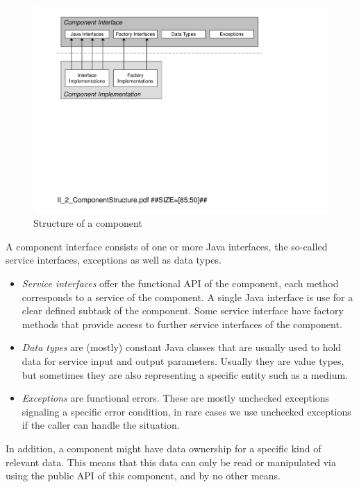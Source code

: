 \begin{figure}[H]
\centering
\includegraphics[width=1.00\textwidth]{figures/II_ComponentStructure.pdf}
\caption{Structure of a component}
\label{fig:5_3_SCH_Komponente}
\end{figure}

A component interface consists of one or more Java interfaces, the so-called service interfaces, exceptions as well as data types.
\begin{itemize}
\item \emph{Service interfaces} offer the functional API of the component, each method corresponds to a service of the component. A single Java interface is use for a clear defined subtask of the component. Some service interface have factory methods that provide access to further service interfaces of the component.
\item \emph{Data types} are (mostly) constant Java classes that are usually used to hold data for service input and output parameters. Usually they are value types, but sometimes they are also representing a specific entity such as a medium.
\item \emph{Exceptions} are functional errors. These are mostly unchecked exceptions signaling a specific error condition, in rare cases we use unchecked exceptions if the caller can handle the situation.
\end{itemize}

In addition, a component might have data ownership for a specific kind of relevant data. This means that this data can only be read or manipulated via using the public API of this component, and by no other means.


